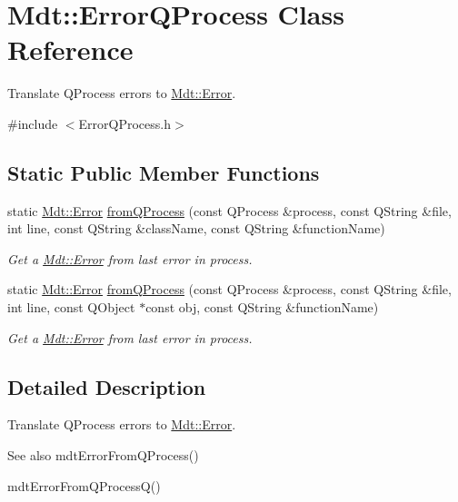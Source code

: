 \hypertarget{class_mdt_1_1_error_q_process}{}\section{Mdt\+:\+:Error\+Q\+Process Class Reference}
\label{class_mdt_1_1_error_q_process}


Translate Q\+Process errors to \hyperlink{class_mdt_1_1_error}{Mdt\+::\+Error}.  




{\ttfamily \#include $<$Error\+Q\+Process.\+h$>$}

\subsection*{Static Public Member Functions}
\begin{DoxyCompactItemize}
\item 
static \hyperlink{class_mdt_1_1_error}{Mdt\+::\+Error} \hyperlink{class_mdt_1_1_error_q_process_a2dda98dd359be476ce2039c5a5a9c157}{from\+Q\+Process} (const Q\+Process \&process, const Q\+String \&file, int line, const Q\+String \&class\+Name, const Q\+String \&function\+Name)
\begin{DoxyCompactList}\small\item\em Get a \hyperlink{class_mdt_1_1_error}{Mdt\+::\+Error} from last error in {\itshape process}. \end{DoxyCompactList}\item 
static \hyperlink{class_mdt_1_1_error}{Mdt\+::\+Error} \hyperlink{class_mdt_1_1_error_q_process_a013ef5e5f23c26375845ef9e925adef3}{from\+Q\+Process} (const Q\+Process \&process, const Q\+String \&file, int line, const Q\+Object $\ast$const obj, const Q\+String \&function\+Name)
\begin{DoxyCompactList}\small\item\em Get a \hyperlink{class_mdt_1_1_error}{Mdt\+::\+Error} from last error in {\itshape process}. \end{DoxyCompactList}\end{DoxyCompactItemize}


\subsection{Detailed Description}
Translate Q\+Process errors to \hyperlink{class_mdt_1_1_error}{Mdt\+::\+Error}. 

\begin{DoxySeeAlso}{See also}
mdt\+Error\+From\+Q\+Process() 

mdt\+Error\+From\+Q\+Process\+Q() 
\end{DoxySeeAlso}


